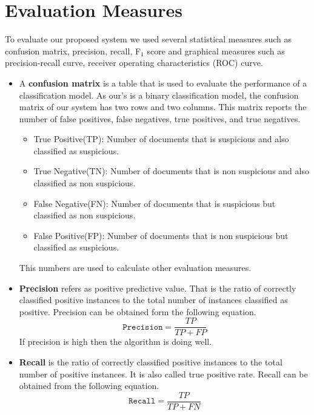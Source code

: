 \section{\textbf{Evaluation Measures}}
To evaluate our proposed system we used several statistical measures such as confusion matrix, precision, recall, F$_1$ score and graphical measures such as precision-recall curve, receiver operating characteristics (ROC) curve.

\begin{itemize}
\item {A \textbf{confusion matrix}} is a table that is used to evaluate the performance of a classification model. As our's is a binary classification model, the confusion matrix of our system has two rows and two columns. This matrix reports the number of false positives, false negatives, true positives, and true negatives.

\begin{itemize}
    \item True Positive(TP): Number of documents that is suspicious and also classified as suspicious.\vspace{0.2cm}
    \item True Negative(TN): Number of documents that is non suspicious and also classified as non suspicious.\vspace{0.2cm}
    \item False Negative(FN): Number of documents that is suspicious but classified as non suspicious.\vspace{0.2cm}
    \item False Positive(FP): Number of documents that is non suspicious but classified as suspicious. 
\end{itemize}

This numbers are used to calculate other evaluation measures.
\vspace{0.3cm}
\item{\textbf{Precision}} refers as positive predictive value. That is the ratio of correctly classified positive instances to the total number of instances classified as positive. Precision can be obtained form  the following equation.
\begin{equation}
    \texttt{Precision} = \frac{TP}{TP+FP}
\end{equation}
If precision is high then the algorithm is doing well.

\vspace{0.3cm}
\item{\textbf{Recall}} is the ratio of correctly classified positive instances to the total number of positive instances. It is also called true positive rate. Recall can be obtained from the following equation.
\begin{equation}
    \texttt{Recall} = \frac{TP}{TP+FN}
\end{equation}


\end{itemize}
